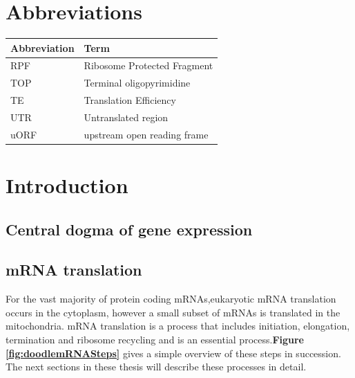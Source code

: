 \documentclass[12pt,openany]{book}
\author{}
\date{\vspace{-2.5em}}
\begin{document}
{
\setcounter{tocdepth}{3}
\tableofcontents
}
\cleardoublepage
\pagestyle{fancy} \fancyhf{} \renewcommand{\headrulewidth}{0pt}
\fancyfoot[LE,RO]{\thepage} \renewcommand{\floatpagefraction}{.9}
\setcounter{page}{9}

\chapter*{Abbreviations}\label{abbreviations}

\begin{tabular}{ll}
\toprule
Abbreviation & Term\\
\midrule
RPF & Ribosome Protected Fragment\\
TOP & Terminal oligopyrimidine\\
TE & Translation Efficiency\\
UTR & Untranslated region\\
uORF & upstream open reading frame\\
\bottomrule
\end{tabular}

\chapter{Introduction}

\section{Central dogma of gene expression}

\section{mRNA translation}

For the vast majority of protein coding mRNAs,eukaryotic mRNA
translation occurs in the cytoplasm, however a small subset of mRNAs is
translated in the mitochondria. mRNA translation is a process that
includes initiation, elongation, termination and ribosome recycling and
is an essential process.\textbf{Figure \ref{fig:doodlemRNASteps}} gives
a simple overview of these steps in succession. The next sections in
these thesis will describe these processes in detail.
\end{document}

